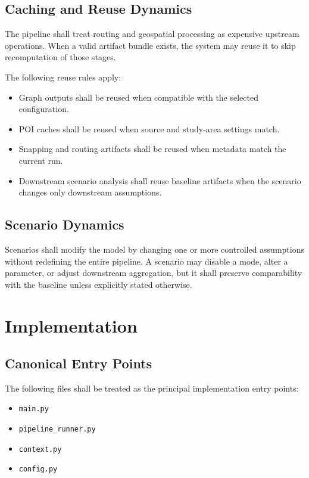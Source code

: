 \documentclass[11pt]{article}
\begin{document}
\subsection*{Caching and Reuse Dynamics}

The pipeline shall treat routing and geospatial processing as expensive upstream operations. When a valid artifact bundle exists, the system may reuse it to skip recomputation of those stages.

The following reuse rules apply:

\begin{itemize}
  \item Graph outputs shall be reused when compatible with the selected configuration.
  \item POI caches shall be reused when source and study-area settings match.
  \item Snapping and routing artifacts shall be reused when metadata match the current run.
  \item Downstream scenario analysis shall reuse baseline artifacts when the scenario changes only downstream assumptions.
\end{itemize}

\subsection*{Scenario Dynamics}

Scenarios shall modify the model by changing one or more controlled assumptions without redefining the entire pipeline. A scenario may disable a mode, alter a parameter, or adjust downstream aggregation, but it shall preserve comparability with the baseline unless explicitly stated otherwise.

\section{Implementation}

\subsection*{Canonical Entry Points}

The following files shall be treated as the principal implementation entry points:

\begin{itemize}
  \item \texttt{main.py}
  \item \texttt{pipeline\_runner.py}
  \item \texttt{context.py}
  \item \texttt{config.py}
\end{itemize}
\end{document}
